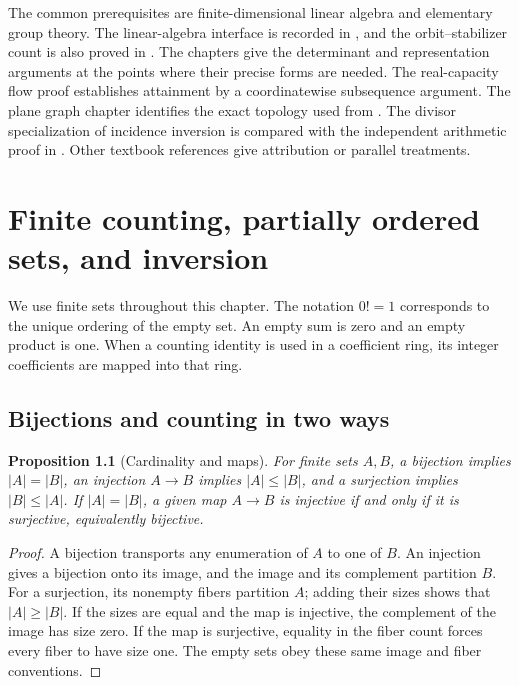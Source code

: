 \documentclass[11pt,oneside,openany]{book}
\theoremstyle{plain}
\newtheorem{proposition}[theorem]{Proposition}
\theoremstyle{definition}
\theoremstyle{remark}
\begin{document}
The common prerequisites are finite-dimensional linear algebra and
elementary group theory. The linear-algebra interface is recorded in
\cite{D05}, and the orbit--stabilizer count is also proved in
\cite{D07}. The chapters give the determinant and representation
arguments at the points where their precise forms are needed.
The real-capacity flow proof establishes attainment by a
coordinatewise subsequence argument. The plane graph
chapter identifies the exact topology used from \cite{P202}. The divisor
specialization of incidence inversion is compared with the independent
arithmetic proof in \cite{P203}. Other textbook references give
attribution or parallel treatments.

\mainmatter
\chapter[Counting and poset inversion]{Finite counting, partially ordered sets, and inversion}
\label{p204:ch01}

We use finite sets throughout this chapter. The notation \(0!=1\)
corresponds to the unique ordering of the empty set. An empty sum is zero
and an empty product is one. When a counting identity is used in a
coefficient ring, its integer coefficients are mapped into that ring.

\section{Bijections and counting in two ways}

\begin{proposition}[Cardinality and maps]\label{p204:W01}
For finite sets \(A,B\), a bijection implies \(|A|=|B|\), an
injection \(A\to B\) implies \(|A|\le |B|\), and a surjection
implies \(|B|\le |A|\). If \(|A|=|B|\), a given map \(A\to B\)
is injective if and only if it is surjective, equivalently bijective.
\end{proposition}
\begin{proof}
A bijection transports any enumeration of \(A\) to one of \(B\).
An injection gives a bijection onto its image, and the image and its
complement partition \(B\). For a surjection, its nonempty fibers
partition \(A\); adding their sizes shows that \(|A|\ge |B|\).
If the sizes are equal and the map is injective, the complement of
the image has size zero. If the map is surjective, equality in the
fiber count forces every fiber to have size one. The empty sets obey
these same image and fiber conventions.
\end{proof}
\end{document}
